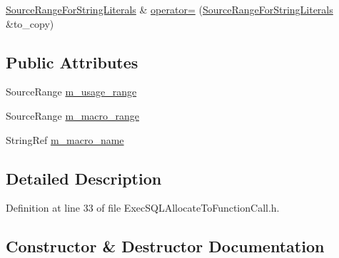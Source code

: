 \begin{DoxyCompactItemize}
\item 
\hyperlink{classclang_1_1tidy_1_1pagesjaunes_1_1_exec_s_q_l_allocate_to_function_call_1_1_source_range_for_string_literals}{Source\+Range\+For\+String\+Literals} \& \hyperlink{classclang_1_1tidy_1_1pagesjaunes_1_1_exec_s_q_l_allocate_to_function_call_1_1_source_range_for_string_literals_a361e8548f6821e1fef104330e7f518fa}{operator=} (\hyperlink{classclang_1_1tidy_1_1pagesjaunes_1_1_exec_s_q_l_allocate_to_function_call_1_1_source_range_for_string_literals}{Source\+Range\+For\+String\+Literals} \&to\+\_\+copy)
\end{DoxyCompactItemize}
\subsection*{Public Attributes}
\begin{DoxyCompactItemize}
\item 
Source\+Range \hyperlink{classclang_1_1tidy_1_1pagesjaunes_1_1_exec_s_q_l_allocate_to_function_call_1_1_source_range_for_string_literals_a089b964c4f0342c8977ebe6fba7d8dbe}{m\+\_\+usage\+\_\+range}
\item 
Source\+Range \hyperlink{classclang_1_1tidy_1_1pagesjaunes_1_1_exec_s_q_l_allocate_to_function_call_1_1_source_range_for_string_literals_a91d18afde86f590be7026adbc16c7882}{m\+\_\+macro\+\_\+range}
\item 
String\+Ref \hyperlink{classclang_1_1tidy_1_1pagesjaunes_1_1_exec_s_q_l_allocate_to_function_call_1_1_source_range_for_string_literals_acc4b24a0371af284563e92158068348f}{m\+\_\+macro\+\_\+name}
\end{DoxyCompactItemize}


\subsection{Detailed Description}


Definition at line 33 of file Exec\+S\+Q\+L\+Allocate\+To\+Function\+Call.\+h.



\subsection{Constructor \& Destructor Documentation}
\mbox{\label{classclang_1_1tidy_1_1pagesjaunes_1_1_exec_s_q_l_allocate_to_function_call_1_1_source_range_for_string_literals_a5323351a409434bc6fc899f6b88eb56c}} 
